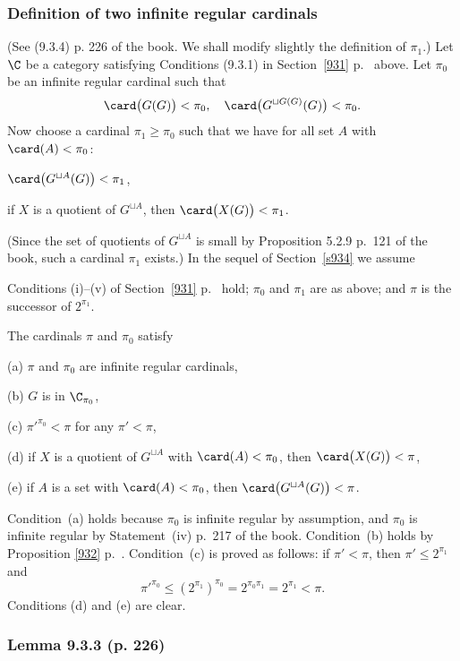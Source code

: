 \documentclass[12pt]{article}
\theoremstyle{remark}
\theoremstyle{definition}
\begin{document}

\subsubsection{Definition of two infinite regular cardinals}

(See (9.3.4) p. 226 of the book. We shall modify slightly the definition of $\pi_1$.) Let $\C$ be a category satisfying Conditions (9.3.1) in Section~\ref{931} p.~ above. Let $\pi_0$ be an infinite regular cardinal such that 
$$
\card\big(G(G)\big)<\pi_0,\quad\card\big(G^{\sqcup G(G)}(G)\big)<\pi_0.
$$ 
Now choose a cardinal $\pi_1\ge\pi_0$ such that we have for all set $A$ with $\card(A)<\pi_0$: 

$\card\big(G^{\sqcup A}(G)\big)<\pi_1$, 

if $X$ is a quotient of $G^{\sqcup A}$, then $\card\big(X(G)\big)<\pi_1$. 

\nn(Since the set of quotients of $G^{\sqcup A}$ is small by Proposition 5.2.9 p.~121 of the book, such a cardinal $\pi_1$ exists.) In the sequel of Section~\ref{s934} we assume 

\begin{cond}
Conditions (i)--(v) of Section~\ref{931} p.~ hold; $\pi_0$ and $\pi_1$ are as above; and $\pi$ is the successor of $2^{\pi_1}$.
\end{cond}

\nn The cardinals $\pi$ and $\pi_0$ satisfy 

(a) $\pi$ and $\pi_0$ are infinite regular cardinals,

(b) $G$ is in $\C_{\pi_0}$,

(c) $\pi'^{\pi_0}<\pi$ for any $\pi'<\pi$, 

(d) if $X$ is a quotient of $G^{\sqcup A}$ with $\card(A)<\pi_0$, then $\card\big(X(G)\big)<\pi$, 

(e) if $A$ is a set with $\card(A)<\pi_0$, then $\card\big(G^{\sqcup A}(G)\big)<\pi$.

\nn Condition~(a) holds because $\pi_0$ is infinite regular by assumption, and $\pi_0$ is infinite regular by Statement~(iv) p.~217 of the book. Condition~(b) holds by Proposition \ref{932} p.~. Condition~(c) is proved as follows: if $\pi'<\pi$, then $\pi'\le2^{\pi_1}$ and 
$$
\pi'^{\pi_0}\le(2^{\pi_1})^{\pi_0}=2^{\pi_0\pi_1}=2^{\pi_1}<\pi.
$$ 
Conditions (d) and (e) are clear. 

\subsubsection{Lemma 9.3.3 (p. 226)}
\end{document}
